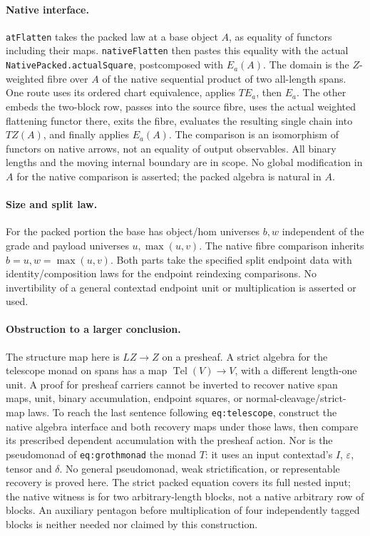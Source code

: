 \paragraph{Native interface.} \texttt{atFlatten} takes the packed law at
a base object $A$, as equality of functors including their maps.
\texttt{nativeFlatten} then pastes this equality with the actual
\texttt{NativePacked.actualSquare}, postcomposed with $E_a(A)$.
The domain is the $Z$-weighted fibre over $A$ of the native sequential
product of two all-length spans. One route uses its ordered chart
equivalence, applies $T E_a$, then $E_a$. The other embeds the two-block
row, passes into the source fibre, uses the actual weighted flattening
functor there, exits the fibre, evaluates the resulting single chain
into $TZ(A)$, and finally applies $E_a(A)$. The comparison is an
isomorphism of functors on native arrows, not an equality of output
observables. All binary lengths and the moving internal boundary are
in scope. No global modification in $A$ for the native comparison
is asserted; the packed algebra is natural in $A$.
\paragraph{Size and split law.} For the packed portion the base has
object/hom universes $b,w$ independent of the grade and payload
universes $u,\max(u,v)$. The native fibre comparison inherits
$b=u,w=\max(u,v)$. Both parts take the specified split endpoint data
with identity/composition laws for the endpoint reindexing comparisons.
No invertibility of a general contextad endpoint unit or multiplication
is asserted or used.
\paragraph{Obstruction to a larger conclusion.} The structure map here
is $LZ\to Z$ on a presheaf. A strict algebra for the telescope monad
on spans has a map $\operatorname{Tel}(V)\to V$, with a different
length-one unit. A proof for presheaf carriers cannot be inverted to
recover native span maps, unit, binary accumulation, endpoint squares,
or normal-cleavage/strict-map laws. To reach the last sentence following
\texttt{eq:telescope}, construct the native algebra interface and both
recovery maps under those laws, then compare its prescribed dependent
accumulation with the presheaf action. Nor is the pseudomonad of
\texttt{eq:grothmonad} the monad $T$: it uses an input contextad's $I$,
$\varepsilon$, tensor and $\delta$. No general pseudomonad, weak
strictification, or representable recovery is proved here. The strict
packed equation covers its full nested input; the native witness is
for two arbitrary-length blocks, not a native arbitrary row of blocks.
An auxiliary pentagon before multiplication of four independently
tagged blocks is neither needed nor claimed by this construction.
